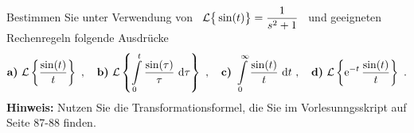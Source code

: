 {
Bestimmen Sie unter Verwendung von \ ${\cal{L}}\big\{\sin(t)\big\} = \dfrac{1}{s^2+1}$ \ und geeigneten Rechenregeln folgende Ausdr\"ucke
	\[
	\textbf{a)} \ {\cal{L}}\left\{\frac{\sin(t)}{t}\right\}\ ,\quad
	\textbf{b)} \ {\cal{L}}\left\{\int\limits_0^t\frac{\sin(\tau)}{\tau}\ \text d\tau\right\}\ ,\quad
	\textbf{c)} \ \int\limits_{0}^{\infty}\frac{\sin(t)}{t}\ \text dt\ ,\quad
	\textbf{d)} \ {\cal{L}}\left\{\EH{-t}\,\frac{\sin(t)}{t}\right\}\ .
\]
\textbf{Hinweis:} Nutzen Sie die Transformationsformel, die Sie im Vorlesunngsskript auf Seite 87-88 finden.


}

